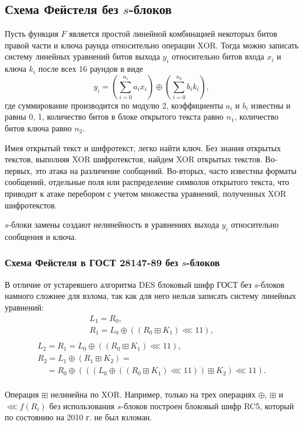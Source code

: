 \subsection{Схема Фейстеля без $s$-блоков}

Пусть функция $F$ является простой линейной комбинацией некоторых битов правой части и ключа раунда относительно операции XOR. Тогда можно записать систему линейных уравнений битов выхода $y_i$ относительно битов входа $x_i$ и ключа $k_i$ после всех 16 раундов в виде
    \[ y_i = (\sum_{i=0}^{n_1} a_i x_i) \oplus (\sum_{i=0}^{n_2} b_i k_i), \]
где суммирование производится по модулю 2, коэффициенты $a_i$ и $b_i$ известны и равны 0, 1, количество битов в блоке открытого текста равно $n_1$, количество битов ключа равно $n_2$.

Имея открытый текст и шифротекст, легко найти ключ. Без знания открытых текстов, выполняя XOR шифротекстов, найдем XOR открытых текстов. Во-первых, это атака на различение сообщений. Во-вторых, часто известны форматы сообщений, отдельные поля или распределение символов открытого текста, что приводит к атаке перебором с учетом множества уравнений, полученных XOR шифротекстов.

$s$-блоки замены создают нелинейность в уравнениях выхода $y_i$ относительно сообщения и ключа.


\subsubsection[Схема Фейстеля в ГОСТ 28147-89 без $s$-блоков]{Схема Фейстеля в ГОСТ 28147-89 без $s$-блоков}

В отличие от устаревшего алгоритма DES блоковый шифр ГОСТ без $s$-блоков намного сложнее для взлома, так как для него нельзя записать систему линейных уравнений:
\[
    \begin{array}{l}
        L_1 = R_0, \\
        R_1 = L_0 \oplus ((R_0 \boxplus K_1) \lll 11), \\
    \end{array}
\] \[
    \begin{array}{l}
        L_2 = R_1 = L_0 \oplus ((R_0 \boxplus K_1) \lll 11), \\
        R_2 = L_1 \oplus (R_1 \boxplus K_2)  = \\
        ~~~~~= R_0 \oplus (((L_0 \oplus ((R_0 \boxplus K_1) \lll 11)) \boxplus K_2) \lll 11). \\
    \end{array}
\]

Операция $\boxplus$ нелинейна по XOR. Например, только на трех операциях $\oplus$, $\boxplus$ и $\lll f(R_i)$ без использования $s$-блоков построен блоковый шифр RC5, который по состоянию на 2010 г. не был взломан.
